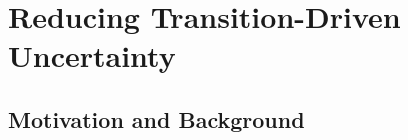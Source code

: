 \documentclass[mathserif]{beamer}
\begin{document}

\section{Reducing Transition-Driven Uncertainty}

\subsection{Motivation and Background}

\end{document}
